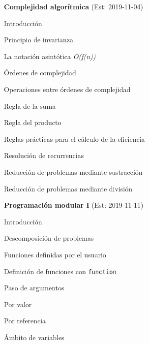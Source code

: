 \begin{longenum}
\begin{longenum}
    \end{longenum}
    \item \textbf{Complejidad algorítmica}  (Est: 2019-11-04)
    \begin{longenum}
        \item Introducción
        \item Principio de invarianza
        \item La notación asintótica \textit{O(f(n))}
        \item Órdenes de complejidad
        \item Operaciones entre órdenes de complejidad
        \begin{longenum}
            \item Regla de la suma
            \item Regla del producto
        \end{longenum}
        \item Reglas prácticas para el cálculo de la eficiencia
        \item Resolución de recurrencias
        \begin{longenum}
            \item Reducción de problemas mediante sustracción
            \item Reducción de problemas mediante división
        \end{longenum}
    \end{longenum}
    \item \textbf{Programación modular I}  (Est: 2019-11-11)
    \begin{longenum}
        \item Introducción
        \begin{longenum}
            \item Descomposición de problemas
        \end{longenum}
        \item Funciones definidas por el usuario
        \begin{longenum}
            \item Definición de funciones con \texttt{function}
            \item Paso de argumentos
            \begin{longenum}
                \item Por valor
                \item Por referencia
            \end{longenum}
            \item Ámbito de variables

\end{longenum}
\end{longenum}
\end{longenum}
